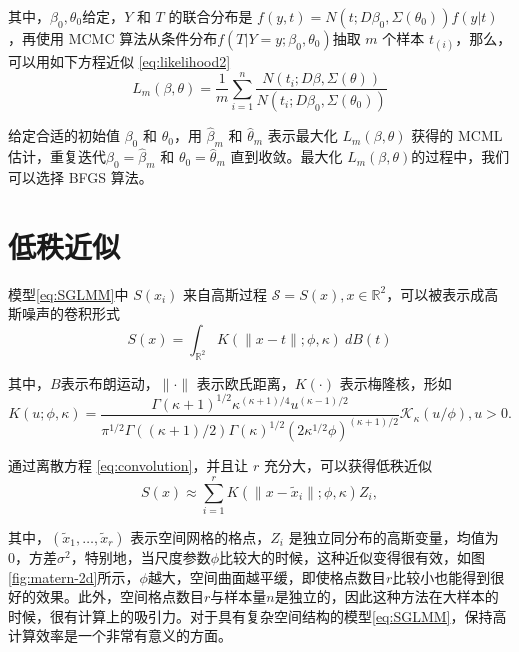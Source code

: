\documentclass[hyperref, a4paper, UTF8, zihao = -4, linespread = 1.25, scheme = chinese]{ctexbook}
\begin{document}
其中，\(\beta_{0},\theta_{0}\)给定，\(Y\) 和 \(T\) 的联合分布是
\(f(y,t)=N(t;D\beta_{0},\Sigma(\theta_{0}))f(y|t)\)，再使用 MCMC
算法从条件分布\(f(T|Y=y;\beta_0,\theta_0)\)抽取 \(m\) 个样本
\(t_{(i)}\)，那么，可以用如下方程近似 \eqref{eq:likelihood2}
\begin{equation}
L_{m}(\beta,\theta)=\frac{1}{m}\sum_{i=1}^{n}\frac{N(t_{i};D\beta,\Sigma(\theta))}{N(t_{i};D\beta_{0},\Sigma(\theta_{0}))} \label{eq:likelihood-approx}
\end{equation}

给定合适的初始值 \(\beta_{0}\) 和 \(\theta_{0}\)，用 \(\hat{\beta}_{m}\)
和 \(\hat{\theta}_{m}\) 表示最大化 \(L_{m}(\beta,\theta)\) 获得的 MCML
估计，重复迭代\(\beta_{0}=\hat{\beta}_{m}\) 和
\(\theta_{0}=\hat{\theta}_{m}\) 直到收敛。最大化
\(L_{m}(\beta,\theta)\)的过程中，我们可以选择 BFGS 算法。

\hypertarget{low-rank}{%
\section{低秩近似}\label{low-rank}}

模型\eqref{eq:SGLMM}中 \(S(x_i)\) 来自高斯过程
\(\mathcal{S} = S(x),x\in \mathbb{R}^2\)，可以被表示成高斯噪声的卷积形式\begin{equation}
S(x) = \int_{\mathbb{R}^2} K(\|x-t\|; \phi, \kappa) \: d B(t) \label{eq:convolution}
\end{equation}

其中，\(B\)表示布朗运动，\(\|\cdot\|\) 表示欧氏距离，\(K(\cdot)\)
表示梅隆核，形如\begin{equation}
K(u; \phi, \kappa) = \frac{\Gamma(\kappa + 1)^{1/2}\kappa^{(\kappa+1)/4}u^{(\kappa-1)/2}}{\pi^{1/2}\Gamma((\kappa+1)/2)\Gamma(\kappa)^{1/2}(2\kappa^{1/2}\phi)^{(\kappa+1)/2}}\mathcal{K}_{\kappa}(u/\phi), u > 0. \label{eq:matern-kernel}
\end{equation}

通过离散方程 \eqref{eq:convolution}，并且让 \(r\)
充分大，可以获得低秩近似\begin{equation}
S(x) \approx \sum_{i = 1}^r K(\|x-\tilde{x}_{i}\|; \phi, \kappa) Z_{i}, \label{eq:lr-approx}
\end{equation}

其中，\((\tilde{x}_{1},\ldots,\tilde{x}_{r})\)
表示空间网格的格点，\(Z_{i}\)
是独立同分布的高斯变量，均值为0，方差\(\sigma^2\)，特别地，当尺度参数\(\phi\)比较大的时候，这种近似变得很有效，如图\ref{fig:matern-2d}所示，\(\phi\)越大，空间曲面越平缓，即使格点数目\(r\)比较小也能得到很好的效果。此外，空间格点数目\(r\)与样本量\(n\)是独立的，因此这种方法在大样本的时候，很有计算上的吸引力。对于具有复杂空间结构的模型\eqref{eq:SGLMM}，保持高计算效率是一个非常有意义的方面。
\end{document}
